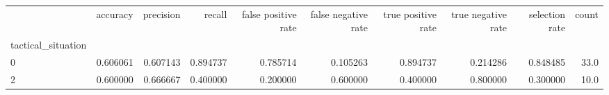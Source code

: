 \begin{tabular}{lrrrrrrrrr}
\toprule
{} &  accuracy &  precision &    recall &  false positive rate &  false negative rate &  true positive rate &  true negative rate &  selection rate &  count \\
tactical\_situation &           &            &           &                      &                      &                     &                     &                 &        \\
\midrule
0                  &  0.606061 &   0.607143 &  0.894737 &             0.785714 &             0.105263 &            0.894737 &            0.214286 &        0.848485 &   33.0 \\
2                  &  0.600000 &   0.666667 &  0.400000 &             0.200000 &             0.600000 &            0.400000 &            0.800000 &        0.300000 &   10.0 \\
\bottomrule
\end{tabular}
